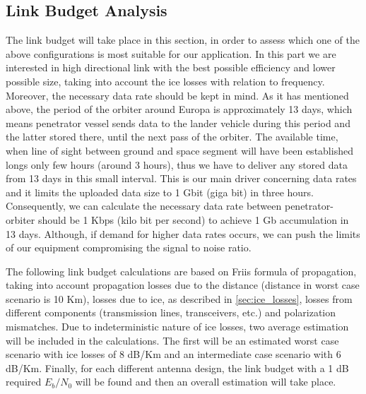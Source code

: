 \subsection{Link Budget Analysis}

The link budget will take place in this section, in order to assess which one of the above configurations is most suitable for our application. In this part we are interested in high directional link with the best possible efficiency and lower possible size, taking into account the ice losses with relation to frequency. Moreover, the necessary data rate should be kept in mind. As it has mentioned above, the period of the orbiter around Europa is approximately 13 days, which means penetrator vessel sends data to the lander vehicle during this period and the latter stored there, until the next pass of the orbiter. The available time, when line of sight between ground and space segment will have been established longs only few hours (around 3 hours), thus we have to deliver any stored data from 13 days in this small interval. This is our main driver concerning data rates and it limits the uploaded data size to 1 Gbit (giga bit) in three hours. Consequently, we can calculate the necessary data rate between penetrator-orbiter should be 1 Kbps (kilo bit per second) to achieve 1 Gb accumulation in 13 days. Although, if demand for higher data rates occurs, we can push the limits of our equipment compromising the signal to noise ratio.

The following link budget calculations are based on Friis formula of propagation, taking into account propagation losses due to the distance (distance in worst case scenario is 10 Km), losses due to ice, as described in \ref{sec:ice_losses}, losses from different components (transmission lines, transceivers, etc.) and polarization mismatches. Due to indeterministic nature of ice losses, two average estimation will be included in the calculations. The first will be an estimated worst case scenario with ice losses of 8 dB/Km and an intermediate case scenario with 6 dB/Km. Finally, for each different antenna design, the link budget with a 1 dB required $E_{b}/N_{0}$ will be found and then an overall estimation will take place. 

